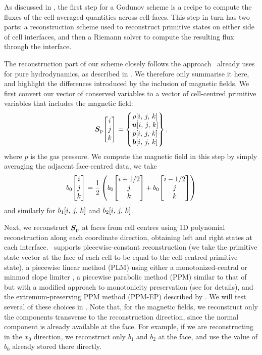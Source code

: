 As discussed in , the first step for a Godunov scheme is a recipe to compute the fluxes of the cell-averaged quantities across cell faces. This step in turn has two parts: a reconstruction scheme used to reconstruct primitive states on either side of cell interfaces, and then a Riemann solver to compute the resulting flux through the interface.

The reconstruction part of our scheme closely follows the approach \quokka~already uses for pure hydrodynamics, as described in . We therefore only summarise it here, and highlight the differences introduced by the inclusion of magnetic fields. We first convert our vector of conserved variables to a vector of cell-centred primitive variables that includes the magnetic field:
\begin{align}
    \bm{S}_\mathrm{p}\!\begin{bmatrix}i\\j\\k\end{bmatrix}
        = \begin{Bmatrix}
            \rho\!\left[ i,\,j,\,k \right] \\
            \bm{u}\!\left[ i,\,j,\,k \right] \\
            p\!\left[ i,\,j,\,k \right] \\
            \bm{b}\!\left[ i,\,j,\,k \right]
        \end{Bmatrix}
    , \label{eqn:state:primitive}
\end{align}
where $p$ is the gas pressure. We compute the magnetic field in this step by simply averaging the adjacent face-centred data, \ie we take
\begin{align}
    b_0\!\begin{bmatrix}i\\j\\k\end{bmatrix}
        = \frac{1}{2} \left( 
            b_0\!\begin{bmatrix}i + 1/2\\j\\k\end{bmatrix} + b_0\!\begin{bmatrix}i - 1/2\\j\\k\end{bmatrix}
         \right)
\end{align}
and similarly for $b_1\!\left[ i,\,j,\,k \right]$ and $b_2\!\left[ i,\,j,\,k \right]$.

Next, we reconstruct $\bm{S}_\mathrm{p}$ at faces from cell centres using 1D polynomial reconstruction along each coordinate direction, obtaining left and right states at each interface. \quokka~supports piecewise-constant reconstruction (\ie we take the primitive state vector at the face of each cell to be equal to the cell-centred primitive state), a piecewise linear method (PLM) using either a monotonized-central or minmod slope limiter \citep{van-Leer74a}, a piecewise parabolic method (PPM) similar to that of \citet{Colella84a} but with a modified approach to monotonicity preservation (see  for details), and the extremum-preserving PPM method (PPM-EP) described by \citet{Rider07a}. We will test several of these choices in . Note that, for the magnetic fields, we reconstruct only the components transverse to the reconstruction direction, since the normal component is already available at the face. For example, if we are reconstructing in the $x_0$ direction, we reconstruct only $b_1$ and $b_2$ at the face, and use the value of $b_0$ already stored there directly.

